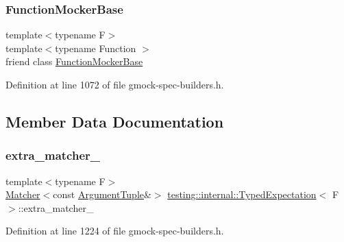 \subsubsection{\texorpdfstring{Function\+Mocker\+Base}{FunctionMockerBase}}
{\footnotesize\ttfamily template$<$typename F$>$ \\
template$<$typename Function $>$ \\
friend class \hyperlink{classtesting_1_1internal_1_1FunctionMockerBase}{Function\+Mocker\+Base}\hspace{0.3cm}{\ttfamily [friend]}}



Definition at line 1072 of file gmock-\/spec-\/builders.\+h.



\subsection{Member Data Documentation}
\mbox{\label{classtesting_1_1internal_1_1TypedExpectation_a7d2fef3d4429a3a350282e6030a45ba4}} 
\subsubsection{\texorpdfstring{extra\+\_\+matcher\+\_\+}{extra\_matcher\_}}
{\footnotesize\ttfamily template$<$typename F$>$ \\
\hyperlink{classtesting_1_1Matcher}{Matcher}$<$const \hyperlink{classtesting_1_1internal_1_1TypedExpectation_a9a91379262d101f435809ba4556d14fa}{Argument\+Tuple}\&$>$ \hyperlink{classtesting_1_1internal_1_1TypedExpectation}{testing\+::internal\+::\+Typed\+Expectation}$<$ F $>$\+::extra\+\_\+matcher\+\_\+\hspace{0.3cm}{\ttfamily [private]}}



Definition at line 1224 of file gmock-\/spec-\/builders.\+h.

\mbox{\label{classtesting_1_1internal_1_1TypedExpectation_a40c442a0e8fffc8bf94611a8130998bf}} 
